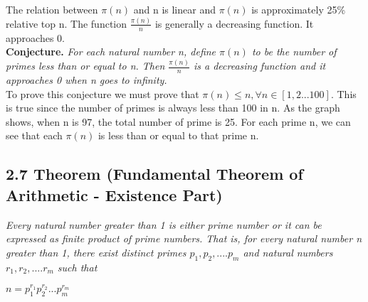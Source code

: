 \documentclass{article}
\begin{document}

The relation between $\pi(n)$ and n is linear and $\pi(n)$ is approximately 25\% relative top n. The function $\frac{\pi(n)}{n}$ is generally a decreasing function. It approaches 0.\\
\textbf{Conjecture.} \textit{For each natural number n, define $\pi(n)$ to be the number of primes less than or equal to n. Then $\frac{\pi(n)}{n}$ is a decreasing function and it approaches 0 when n goes to infinity.}\\
To prove this conjecture we must prove that $\pi(n) \leq n, \forall n \in [1,2...100]$. This is true since the number of primes is always less than 100 in n. As the graph shows, when n is 97, the total number of prime is 25. For each prime n, we can see that each $\pi(n)$ is less than or equal to that prime n.  

\subsection*{2.7 Theorem (Fundamental Theorem of Arithmetic - Existence Part)} 
\quad \textit{Every natural number greater than 1 is either prime number or it can be expressed as finite product of prime numbers. That is, for every natural number n greater than 1, there exist distinct primes $p_1, p_2,....p_m$ and natural numbers $r_1,r_2,....r_m$ such that}

\begin{center}
    $n=p_{1}^{r_1}p_{2}^{r_2}...p_{m}^{r_m}$
\end{center}
\end{document}
